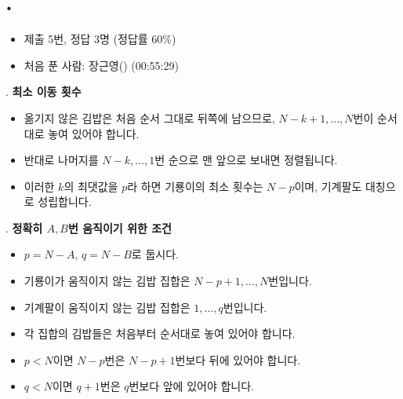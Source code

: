 
\section{\texorpdfstring{\pletter. \ptitle}{문제 \pletter}}

\begin{frame}[label=problem-C]
    \sectiontitle{\pletter}{\ptitle}
    \begin{itemize}
        \item 제출 5번, 정답 3명 (정답률 60\%)
        \item 처음 푼 사람: 장근영() (00:55:29)
    \end{itemize}
\end{frame}

\begin{frame}{\textbf{\pletter}. \ptitle}
    \textbf{최소 이동 횟수}
    \begin{itemize}
        \item 옮기지 않은 김밥은 처음 순서 그대로 뒤쪽에 남으므로, $N-k+1,\ldots,N$번이 순서대로 놓여 있어야 합니다.
        \item 반대로 나머지를 $N-k,\ldots,1$번 순으로 맨 앞으로 보내면 정렬됩니다.
        \item 이러한 $k$의 최댓값을 $p$라 하면 기룡이의 최소 횟수는 $N-p$이며, 기계팔도 대칭으로 성립합니다.
    \end{itemize}
\end{frame}

\begin{frame}{\textbf{\pletter}. \ptitle}
    \textbf{정확히 $A,B$번 움직이기 위한 조건}
    \begin{itemize}
        \item $p=N-A$, $q=N-B$로 둡시다.
        \item 기룡이가 움직이지 않는 김밥 집합은 $N-p+1,\ldots,N$번입니다.
        \item 기계팔이 움직이지 않는 김밥 집합은 $1,\ldots,q$번입니다.
        \item 각 집합의 김밥들은 처음부터 순서대로 놓여 있어야 합니다.
        \item $p<N$이면 $N-p$번은 $N-p+1$번보다 뒤에 있어야 합니다.
        \item $q<N$이면 $q+1$번은 $q$번보다 앞에 있어야 합니다.
    \end{itemize}
\end{frame}

